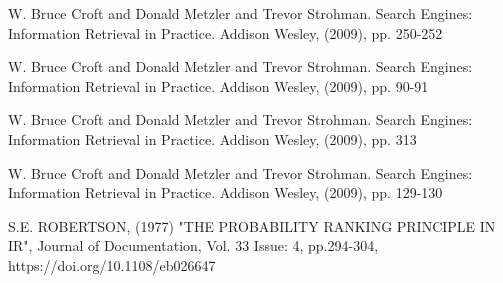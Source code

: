\documentclass[runningheads]{llncs}
\begin{document}
\begin{thebibliography}{8}

W. Bruce Croft and Donald Metzler and Trevor Strohman. Search Engines: Information Retrieval in Practice. Addison Wesley, (2009), pp. 250-252

W. Bruce Croft and Donald Metzler and Trevor Strohman. Search Engines: Information Retrieval in Practice. Addison Wesley, (2009), pp. 90-91

W. Bruce Croft and Donald Metzler and Trevor Strohman. Search Engines: Information Retrieval in Practice. Addison Wesley, (2009), pp. 313

W. Bruce Croft and Donald Metzler and Trevor Strohman. Search Engines: Information Retrieval in Practice. Addison Wesley, (2009), pp. 129-130

S.E. ROBERTSON, (1977) "THE PROBABILITY RANKING PRINCIPLE IN IR", Journal of Documentation, Vol. 33 Issue: 4, pp.294-304, https://doi.org/10.1108/eb026647

\end{thebibliography}

\begin{figure}[h!]
\end{figure}
\end{document}
